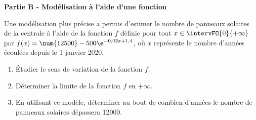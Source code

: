 \smallskip

\textbf{Partie B - Modélisation à l’aide d’une fonction}

\medskip

Une modélisation plus précise a permis d’estimer le nombre de panneaux solaires de la centrale à l’aide de la fonction $f$ définie pour tout $x \in \intervFO{0}{+\infty}$ par $f(x)=\num{12500}-500\e^{-0,02x+1,4}$, où $x$ représente le nombre d’années écoulées depuis le 1 janvier 2020.

\begin{enumerate}
	\item Étudier le sens de variation de la fonction $f$.
	\item Déterminer la limite de la fonction $f$ en $+\infty$.
	\item En utilisant ce modèle, déterminer au bout de combien d’années le nombre de panneaux solaires dépassera \num{12000}.
\end{enumerate}

